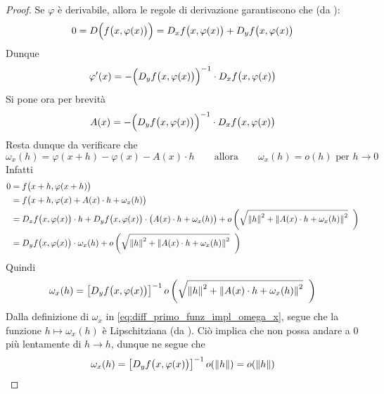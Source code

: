 \begin{theorem}
\begin{proof}
		Se $\varphi$ è derivabile, allora le regole di derivazione garantiscono che (da ):
		\[0 = D \Bigl( f \bigl( x, \varphi(x) \bigr) \Bigr) = D_xf \bigl( x, \varphi(x) \bigr) + D_yf \bigl( x, \varphi(x) \bigr)\]
		Dunque
		\[\varphi'(x) = -\Bigl( D_yf \bigl( x, \varphi(x) \bigr) \Bigr)^{-1} \cdot D_xf \bigl( x, \varphi(x) \bigr)\]
		Si pone ora per brevità
		\[A(x) = - \Bigl( D_yf \bigl( x, \varphi(x) \bigr) \Bigr)^{-1} \cdot D_xf \bigl( x, \varphi(x) \bigr)\]
		Resta dunque da verificare che
		\begin{equation}
			\label{eq:diff_primo_funz_impl_omega_x}
			\omega_x(h) = \varphi(x + h) - \varphi(x) - A(x) \cdot h \qquad \text{allora} \qquad \omega_x(h) = o(h) \text{ per } h \to 0
		\end{equation}
		Infatti
		\begin{align*}
			0 &= f \bigl( x + h, \varphi(x + h) \bigr)\\
			&= f \bigl( x + h, \varphi(x) + A(x) \cdot h + \omega_x(h) \bigr)\\
			&= D_xf \bigl( x, \varphi(x) \bigr) \cdot h + D_yf \bigl( x, \varphi(x) \bigr) \cdot \bigl( A(x) \cdot h + \omega_x(h) \bigr) + o \left( \sqrt{ \left\|h\right\|^2 + \left\|A(x) \cdot h + \omega_x(h)\right\|^2 } \;\; \right)\\
			&= D_yf \bigl( x, \varphi(x) \bigr) \cdot \omega_x(h) + o \left( \sqrt{ \left\|h\right\|^2 + \left\|A(x) \cdot h + \omega_x(h)\right\|^2 } \;\; \right)
		\end{align*}
		Quindi
		\[\omega_x(h) = \left[ D_yf \bigl( x, \varphi(x) \bigr) \right]^{-1} o \left( \sqrt{ \left\|h\right\|^2 + \left\|A(x) \cdot h + \omega_x(h)\right\|^2 } \;\; \right)\]
		Dalla definizione di $\omega_x$ in \cref{eq:diff_primo_funz_impl_omega_x}, segue che la funzione $h \mapsto \omega_x(h)$ è Lipschitziana (da ). Ciò implica che non possa andare a $0$ più lentamente di $h \to h$, dunque ne segue che
		\[\omega_x(h) = \left[ D_yf \bigl( x, \varphi(x) \bigr) \right]^{-1} o(\left\|h\right\|) = o(\left\|h\right\|)\]
		\cbend
	\end{proof}
\end{theorem}
